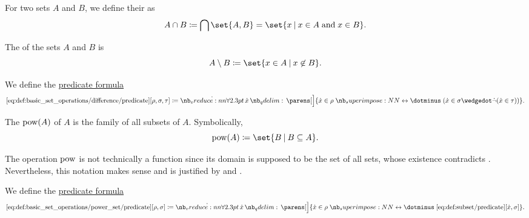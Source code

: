 \begin{definition}
\begin{thmenum}
    For two sets \( A \) and \( B \), we define their  as
    \begin{equation*}
      A \cap B \coloneqq \bigcap \set{ A, B } = \set{ x \given x \in A \T{and} x \in B }.
    \end{equation*}

     The  of the sets \( A \) and \( B \) is
    \begin{equation*}
      A \setminus B \coloneqq \set{ x \in A \given x \not\in B }.
    \end{equation*}

    We define the \hyperref[con:predicate_formula]{predicate formula}
    \begin{equation*}\taglabel[\op{IsDifference}]{eq:def:basic_set_operations/difference/predicate}
      \ref{eq:def:basic_set_operations/difference/predicate}[\rho, \sigma, \tau] \coloneqq \qforall \synx \parens[\Big]{ \synx \in \rho \syniff (\synx \in \sigma \synwedge \synneg(\synx \in \tau)) }.
    \end{equation*}

     The  \( \operatorname{pow}(A) \) of \( A \) is the family of all subsets of \( A \). Symbolically,
    \begin{equation*}
      \pow(A) \coloneqq \set{ B \given B \subseteq A }.
    \end{equation*}

    The operation \( \operatorname{pow} \) is not technically a function since its domain is supposed to be the set of all sets, whose existence contradicts . Nevertheless, this notation makes sense and is justified by  and .

    We define the \hyperref[con:predicate_formula]{predicate formula}
    \begin{equation*}\taglabel[\op{IsPowerSet}]{eq:def:basic_set_operations/power_set/predicate}
      \ref{eq:def:basic_set_operations/power_set/predicate}[\rho, \sigma] \coloneqq \qforall \synx \parens[\Big]{ \synx \in \rho \syniff \ref{eq:def:subset/predicate}[\synx, \sigma] }.
    \end{equation*}
  \end{thmenum}
\end{definition}

